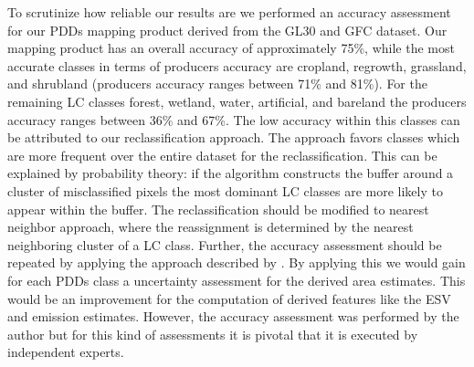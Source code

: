 		To scrutinize how reliable our results are we performed an accuracy assessment for our \acp{PDD} mapping product derived from the \ac{GL30} and \ac{GFC} dataset. Our mapping product has an overall accuracy of approximately 75\%, while the most accurate classes in terms of producers accuracy are cropland, regrowth, grassland, and shrubland (producers accuracy ranges between 71\% and 81\%). For the remaining \ac{LC} classes forest, wetland, water, artificial, and bareland the producers accuracy ranges between 36\% and 67\%. The low accuracy within this classes can be attributed to our reclassification approach. The approach favors classes which are more frequent over the entire dataset for the reclassification. This can be explained by probability theory: if the algorithm constructs the buffer around a cluster of misclassified pixels the most dominant \ac{LC} classes are more likely to appear within the buffer. The reclassification should be modified to nearest neighbor approach, where the reassignment is determined by the nearest neighboring cluster of a \ac{LC} class. Further, the accuracy assessment should be repeated by applying the approach described by \citet{Olofsson2014}. By applying this we would gain for each \acp{PDD} class a uncertainty assessment for the derived area estimates. This would be an improvement for the computation of derived features like the \ac{ESV} and emission estimates. However, the accuracy assessment was performed by the author but for this kind of assessments it is pivotal that it is executed by independent experts.

